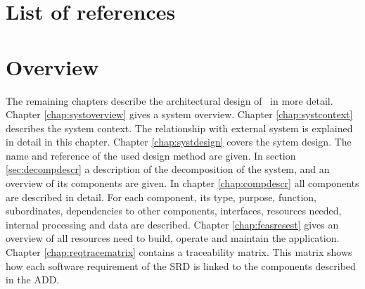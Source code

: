 \section{List of references}





\section{Overview}
The remaining chapters describe the architectural design of \projectname\ in more detail. Chapter \ref{chap:systoverview} gives a system overview. Chapter \ref{chap:systcontext} describes the system context. The relationship with external system is explained in detail in this chapter. Chapter \ref{chap:systdesign} covers the sytem design. The name and reference of the used design method are given. In section \ref{sec:decompdescr} a description of the decomposition of the system, and an overview of its components are given.
In chapter \ref{chap:compdescr} all components are described in detail. For each component, its type, purpose, function, subordinates, dependencies to other components, interfaces, resources needed, internal processing and  data are described. Chapter \ref{chap:feasresest} gives an overview of all resources need to build, operate and maintain the application. Chapter \ref{chap:reqtracematrix} contains a traceability matrix. This matrix shows how each software requirement of the SRD \cite{srd} is linked to the components described in the ADD.


